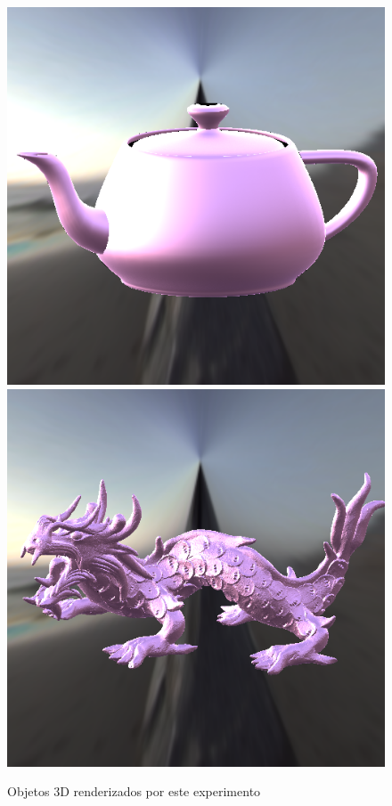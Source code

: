 \begin{figure}[H]
    \caption{\small{Objetos 3D renderizados por este experimento}}\label{fig-cook-torrance-alternative-eqlang}
  \includegraphics[width=\linewidth]{./Imagens/brdfs/cook-torrance-alternative-teapot.png}
\endminipage\hfill
{}
  \includegraphics[width=\linewidth]{./Imagens/brdfs/cook-torrance-alternative-dragon.png}

\end{figure}
